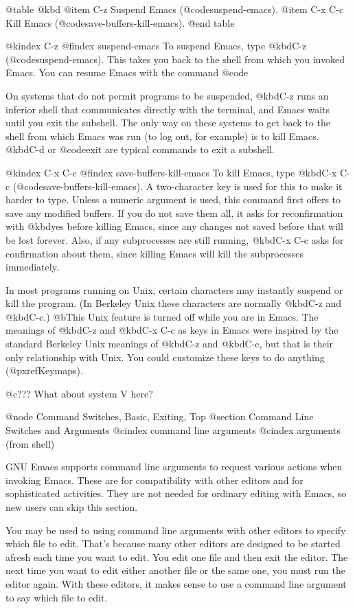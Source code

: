 {{@table @kbd
@item C-z
Suspend Emacs (@code{suspend-emacs}).
@item C-x C-c
Kill Emacs (@code{save-buffers-kill-emacs}).
@end table

@kindex C-z
@findex suspend-emacs
  To suspend Emacs, type @kbd{C-z} (@code{suspend-emacs}).  This takes
you back to the shell from which you invoked Emacs.  You can resume
Emacs with the command @code{%

  On systems that do not permit programs to be suspended, @kbd{C-z} runs an
inferior shell that communicates directly with the terminal, and Emacs
waits until you exit the subshell.  The only way on these systems to get
back to the shell from which Emacs was run (to log out, for example) is to
kill Emacs.  @kbd{C-d} or @code{exit} are typical commands to exit a
subshell.

@kindex C-x C-c
@findex save-buffers-kill-emacs
  To kill Emacs, type @kbd{C-x C-c} (@code{save-buffers-kill-emacs}).  A
two-character key is used for this to make it harder to type.  Unless a
numeric argument is used, this command first offers to save any modified
buffers.  If you do not save them all, it asks for reconfirmation with
@kbd{yes} before killing Emacs, since any changes not saved before that will be
lost forever.  Also, if any subprocesses are still running, @kbd{C-x C-c}
asks for confirmation about them, since killing Emacs will kill the
subprocesses immediately.

  In most programs running on Unix, certain characters may instantly
suspend or kill the program.  (In Berkeley Unix these characters are
normally @kbd{C-z} and @kbd{C-c}.)  @b{This Unix feature is turned off
while you are in Emacs.}  The meanings of @kbd{C-z} and @kbd{C-x C-c} as
keys in Emacs were inspired by the standard Berkeley Unix meanings of
@kbd{C-z} and @kbd{C-c}, but that is their only relationship with
Unix.  You could customize these keys to do anything (@pxref{Keymaps}).

@c??? What about system V here?

@node Command Switches, Basic, Exiting, Top
@section Command Line Switches and Arguments
@cindex command line arguments
@cindex arguments (from shell)

  
  GNU Emacs supports command line arguments to request various actions
when invoking Emacs.  These are for compatibility with other editors and
for sophisticated activities.  They are not needed for ordinary editing
with Emacs, so new users can skip this section.

  You may be used to using command line arguments with other editors
to specify which file to edit.  That's because many other editors are
designed to be started afresh each time you want to edit.  You
edit one file and then exit the editor.  The next time you want to edit
either another file or the same one, you must run the editor again.
With these editors, it makes sense to use a command line argument
to say which file to edit.

}}}
